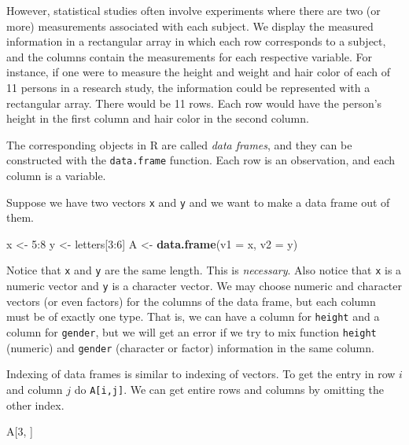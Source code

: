 \documentclass[]{book}
\newenvironment{Shaded}{\begin{snugshade}}{\end{snugshade}}
\newcommand{\KeywordTok}[1]{\textcolor[rgb]{0.13,0.29,0.53}{\textbf{{#1}}}}
\newcommand{\DataTypeTok}[1]{\textcolor[rgb]{0.13,0.29,0.53}{{#1}}}
\newcommand{\DecValTok}[1]{\textcolor[rgb]{0.00,0.00,0.81}{{#1}}}
\newcommand{\StringTok}[1]{\textcolor[rgb]{0.31,0.60,0.02}{{#1}}}
\newcommand{\NormalTok}[1]{{#1}}
\numberwithin{equation}{chapter}
\numberwithin{figure}{chapter}
\theoremstyle{plain}
\theoremstyle{definition}
\theoremstyle{remark}
\theoremstyle{definition}
\theoremstyle{definition}
\theoremstyle{remark}
\let\BeginKnitrBlock\begin \let\EndKnitrBlock\end
\begin{document}
However, statistical studies often involve experiments where there are
two (or more) measurements associated with each subject. We display the
measured information in a rectangular array in which each row
corresponds to a subject, and the columns contain the measurements for
each respective variable. For instance, if one were to measure the
height and weight and hair color of each of 11 persons in a research
study, the information could be represented with a rectangular array.
There would be 11 rows. Each row would have the person's height in the
first column and hair color in the second column.

The corresponding objects in R are called \emph{data frames}, and they
can be constructed with the \texttt{data.frame} function. Each row is an
observation, and each column is a variable.

\bigskip

\BeginKnitrBlock{example}
\protect\hypertarget{ex:unnamed-chunk-65}{}{\label{ex:unnamed-chunk-65}}Suppose
we have two vectors \texttt{x} and \texttt{y} and we want to make a data
frame out of them.
\EndKnitrBlock{example}

\begin{Shaded}
\begin{Highlighting}[]
\NormalTok{x <-}\StringTok{ }\DecValTok{5}\NormalTok{:}\DecValTok{8}
\NormalTok{y <-}\StringTok{ }\NormalTok{letters[}\DecValTok{3}\NormalTok{:}\DecValTok{6}\NormalTok{]}
\NormalTok{A <-}\StringTok{ }\KeywordTok{data.frame}\NormalTok{(}\DataTypeTok{v1 =} \NormalTok{x, }\DataTypeTok{v2 =} \NormalTok{y)}
\end{Highlighting}
\end{Shaded}

Notice that \texttt{x} and \texttt{y} are the same length. This is
\emph{necessary}. Also notice that \texttt{x} is a numeric vector and
\texttt{y} is a character vector. We may choose numeric and character
vectors (or even factors) for the columns of the data frame, but each
column must be of exactly one type. That is, we can have a column for
\texttt{height} and a column for \texttt{gender}, but we will get an
error if we try to mix function \texttt{height} (numeric) and
\texttt{gender} (character or factor) information in the same column.

Indexing of data frames is similar to indexing of vectors. To get the
entry in row \(i\) and column \(j\) do \texttt{A{[}i,j{]}}. We can get
entire rows and columns by omitting the other index.

\begin{Shaded}
\begin{Highlighting}[]
\NormalTok{A[}\DecValTok{3}\NormalTok{, ]}
\end{Highlighting}
\end{Shaded}
\end{document}
